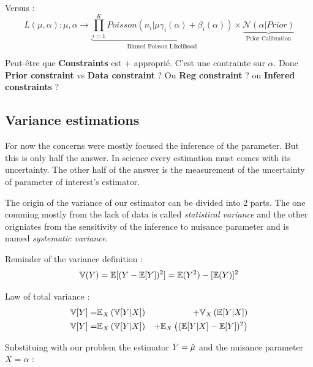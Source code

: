Versus :
\begin{equation}
	L(\mu, \alpha) : \mu, \alpha 
	\to \underbrace{\prod_{i=1}^K Poisson(n_i | \mu \gamma_i(\alpha) + \beta_i(\alpha))}_{\text{Binned Poisson Likelihood}} 
	\times \underbrace{\mathcal N(\alpha |  Prior)}_{\text{Prior Calibration}}
\end{equation}

Peut-être que \textbf{Constraints} est + approprié. C'est une contrainte sur $\alpha$. Donc \textbf{Prior constraint} vs \textbf{Data constraint} ? Ou \textbf{Reg constraint} ? ou \textbf{Infered constraints} ?



\subsection{Variance estimations} %
\label{sub:variance_estimations}


For now the concerns were mostly focused the inference of the parameter.
But this is only half the answer.
In science every estimation must comes with its uncertainty.
The other half of the answer is the measurement of the uncertainty of parameter of interest's estimator.

The origin of the variance of our estimator can be divided into 2 parts.
The one comming mostly from the lack of data is called \emph{statistical variance} and the other origniates from the sensitivity of the inference to nuisance parameter and is named \emph{systematic variance}.

Reminder of the variance definition :
\begin{equation}
	\mathbb{V}(Y) = \mathbb{E}[(Y - \mathbb{E}[Y])^2] = \mathbb{E}(Y^2) - [\mathbb{E}(Y)]^2
\end{equation}

Law of total variance \needcite :
\begin{eqnarray}
\label{eq:total_variance_law}
    \mathbb{V}[Y] =& \mathbb{E}_X \left (\mathbb{V}[Y|X] \right ) &+ \mathbb{V}_X \left (\mathbb{E}[Y|X]\right ) \\
    \mathbb{V}[Y] =& \mathbb{E}_X \left (\mathbb{V}[Y|X] \right ) &+ \mathbb{E}_X \left ( (\mathbb{E} [Y|X]  - \mathbb{E}[Y])^2\right )
\end{eqnarray}


Substituing with our problem the estimator $Y = \hat\mu$ and the nuisance parameter $X = \alpha$ :

